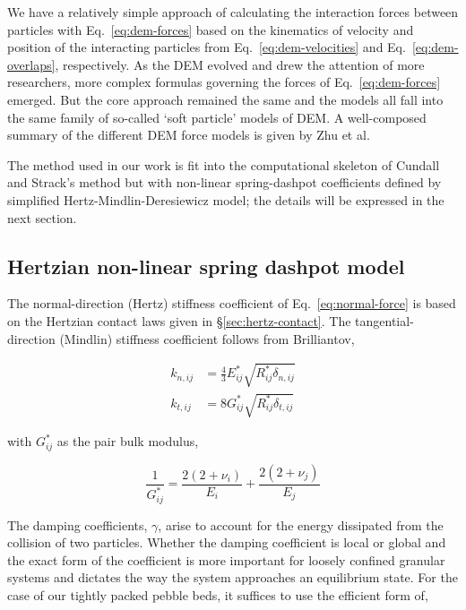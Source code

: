 We have a relatively simple approach of calculating the interaction forces between particles with Eq.~\ref{eq:dem-forces} based on the kinematics of velocity and position of the interacting particles from Eq.~\ref{eq:dem-velocities} and Eq.~\ref{eq:dem-overlaps}, respectively. As the DEM evolved and drew the attention of more researchers, more complex formulas governing the forces of Eq.~\ref{eq:dem-forces} emerged. But the core approach remained the same and the models all fall into the same family of so-called `soft particle' models of DEM. A well-composed summary of the different DEM force models is given by Zhu et al\cite{Zhu2007}.

The method used in our work is fit into the computational skeleton of Cundall and Strack's method but with non-linear spring-dashpot coefficients defined by simplified Hertz-Mindlin-Deresiewicz model; the details will be expressed in the next section.



\subsection{Hertzian non-linear spring dashpot model}

The normal-direction (Hertz) stiffness coefficient of Eq.~\ref{eq:normal-force} is based on the Hertzian contact laws given in \S\ref{sec:hertz-contact}. The tangential-direction (Mindlin) stiffness coefficient follows from Brilliantov\cite{Brilliantov1996, Zhu2007, Langston1995},

\begin{subequations}
\begin{align}
	k_{n,ij} &= \frac{4}{3}E_{ij}^*\sqrt{R_{ij}^*\delta_{n,ij}} \\
	k_{t,ij} &= 8 G_{ij}^*\sqrt{R_{ij}^*\delta_{t,ij}}
\end{align}
\end{subequations}

with $G_{ij}^*$ as the pair bulk modulus,

\begin{equation}
	\frac{1}{G^*_{ij}} = \frac{2(2+\nu_i)}{E_i} + \frac{2(2+\nu_j)}{E_j}
\end{equation}

The damping coefficients, $\gamma$, arise to account for the energy dissipated from the collision of two particles\cite{DiRenzo2004, Tsuji1992, Tsuji1993}. Whether the damping coefficient is local or global and the exact form of the coefficient is more important for loosely confined granular systems and dictates the way the system approaches an equilibrium state\cite{Makse2004}. For the case of our tightly packed pebble beds, it suffices to use the efficient form of\cite{Dippel1996, Makse2004, Brilliantov1996, Zhang2005, Zhu2007},

